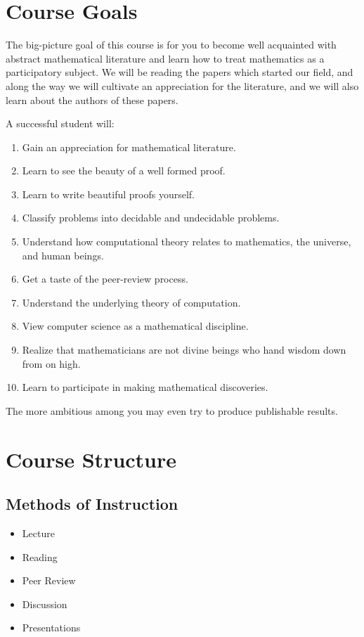 \documentclass[11pt]{article}
\begin{document}
\section*{Course Goals}
The big-picture goal of this course is for you to become well
acquainted with abstract mathematical literature and learn how to
treat mathematics as a participatory subject. We will be reading the
papers which started our field, and along the way we will cultivate an
appreciation for the literature, and we will also learn about the
authors of these papers.

A successful student will:
\begin{enumerate}
    \item Gain an appreciation for mathematical literature.
    \item Learn to see the beauty of a well formed proof.
    \item Learn to write beautiful proofs yourself.
    \item Classify problems into decidable and undecidable problems.
    \item Understand how computational theory relates to mathematics,
        the universe, and human beings.
    \item Get a taste of the peer-review process.
    \item Understand the underlying theory of computation.
    \item View computer science as a mathematical discipline.
    \item Realize that mathematicians are not divine beings who hand
        wisdom down from on high.
    \item Learn to participate in making mathematical discoveries.
\end{enumerate}

The more ambitious among you may even try to produce publishable results. 

\section*{Course Structure}
\subsection*{Methods of Instruction}
\begin{itemize}
    \item Lecture
    \item Reading
    \item Peer Review
    \item Discussion
    \item Presentations
\end{itemize}
\end{document}
